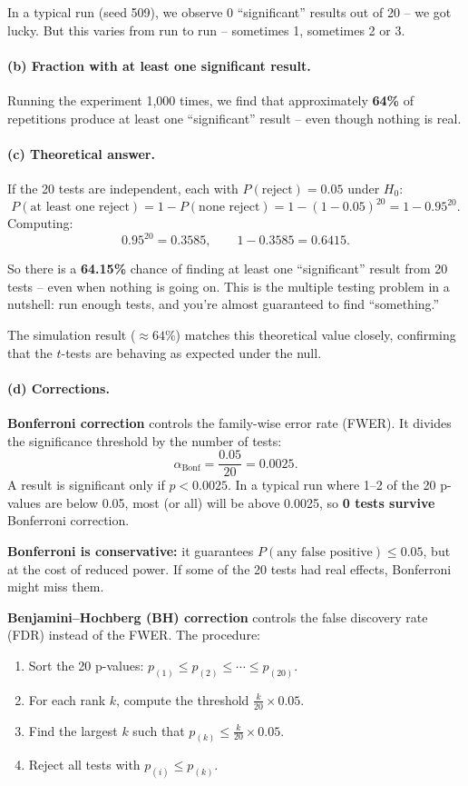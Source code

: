 \documentclass[11pt]{article}
\begin{document}
In a typical run (seed 509), we observe 0 ``significant'' results out of 20 -- we got lucky. But this varies from run to run -- sometimes 1, sometimes 2 or 3.

\paragraph{(b) Fraction with at least one significant result.}

Running the experiment 1,000 times, we find that approximately \textbf{64\%} of repetitions produce at least one ``significant'' result -- even though nothing is real.

\paragraph{(c) Theoretical answer.}

If the 20 tests are independent, each with $P(\text{reject}) = 0.05$ under $H_0$:
\[
  P(\text{at least one reject}) = 1 - P(\text{none reject}) = 1 - (1 - 0.05)^{20} = 1 - 0.95^{20}.
\]
Computing:
\[
  0.95^{20} = 0.3585, \qquad 1 - 0.3585 = \boxed{0.6415}.
\]

So there is a \textbf{64.15\%} chance of finding at least one ``significant'' result from 20 tests -- even when nothing is going on. This is the multiple testing problem in a nutshell: run enough tests, and you're almost guaranteed to find ``something.''

The simulation result ($\approx 64\%$) matches this theoretical value closely, confirming that the $t$-tests are behaving as expected under the null.

\paragraph{(d) Corrections.}

\textbf{Bonferroni correction} controls the family-wise error rate (FWER). It divides the significance threshold by the number of tests:
\[
  \alpha_{\text{Bonf}} = \frac{0.05}{20} = 0.0025.
\]
A result is significant only if $p < 0.0025$. In a typical run where 1--2 of the 20 p-values are below 0.05, most (or all) will be above 0.0025, so \textbf{0 tests survive} Bonferroni correction.

\textbf{Bonferroni is conservative:} it guarantees $P(\text{any false positive}) \leq 0.05$, but at the cost of reduced power. If some of the 20 tests had real effects, Bonferroni might miss them.

\textbf{Benjamini--Hochberg (BH) correction} controls the false discovery rate (FDR) instead of the FWER. The procedure:
\begin{enumerate}
  \item Sort the 20 p-values: $p_{(1)} \leq p_{(2)} \leq \cdots \leq p_{(20)}$.
  \item For each rank $k$, compute the threshold $\frac{k}{20} \times 0.05$.
  \item Find the largest $k$ such that $p_{(k)} \leq \frac{k}{20} \times 0.05$.
  \item Reject all tests with $p_{(i)} \leq p_{(k)}$.
\end{enumerate}
\end{document}
